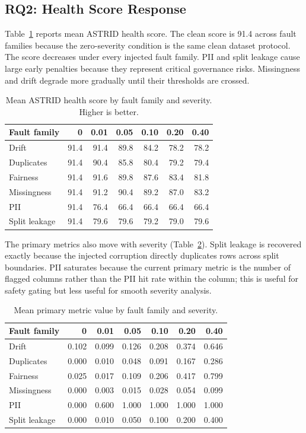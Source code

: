 \documentclass[runningheads]{llncs}
\begin{document}
\subsection{RQ2: Health Score Response}

Table~\ref{tab:score-mean} reports mean ASTRID health score. The clean score is
91.4 across fault families because the zero-severity condition is the same clean
dataset protocol. The score decreases under every injected fault family. PII and
split leakage cause large early penalties because they represent critical
governance risks. Missingness and drift degrade more gradually until their
thresholds are crossed.

\begin{table}
\centering
\caption{Mean ASTRID health score by fault family and severity. Higher is better.}
\label{tab:score-mean}
\scriptsize
\begin{tabular}{lrrrrrr}
\toprule
Fault family & 0 & 0.01 & 0.05 & 0.10 & 0.20 & 0.40 \\
\midrule
Drift & 91.4 & 91.4 & 89.8 & 84.2 & 78.2 & 78.2 \\
Duplicates & 91.4 & 90.4 & 85.8 & 80.4 & 79.2 & 79.4 \\
Fairness & 91.4 & 91.6 & 89.8 & 87.6 & 83.4 & 81.8 \\
Missingness & 91.4 & 91.2 & 90.4 & 89.2 & 87.0 & 83.2 \\
PII & 91.4 & 76.4 & 66.4 & 66.4 & 66.4 & 66.4 \\
Split leakage & 91.4 & 79.6 & 79.6 & 79.2 & 79.0 & 79.6 \\
\bottomrule
\end{tabular}
\end{table}

The primary metrics also move with severity (Table~\ref{tab:primary-metrics}).
Split leakage is recovered exactly because the injected corruption directly
duplicates rows across split boundaries. PII saturates because the current primary
metric is the number of flagged columns rather than the PII hit rate within the
column; this is useful for safety gating but less useful for smooth severity
analysis.

\begin{table}
\centering
\caption{Mean primary metric value by fault family and severity.}
\label{tab:primary-metrics}
\scriptsize
\begin{tabular}{lrrrrrr}
\toprule
Fault family & 0 & 0.01 & 0.05 & 0.10 & 0.20 & 0.40 \\
\midrule
Drift & 0.102 & 0.099 & 0.126 & 0.208 & 0.374 & 0.646 \\
Duplicates & 0.000 & 0.010 & 0.048 & 0.091 & 0.167 & 0.286 \\
Fairness & 0.025 & 0.017 & 0.109 & 0.206 & 0.417 & 0.799 \\
Missingness & 0.000 & 0.003 & 0.015 & 0.028 & 0.054 & 0.099 \\
PII & 0.000 & 0.600 & 1.000 & 1.000 & 1.000 & 1.000 \\
Split leakage & 0.000 & 0.010 & 0.050 & 0.100 & 0.200 & 0.400 \\
\bottomrule
\end{tabular}
\end{table}
\end{document}
